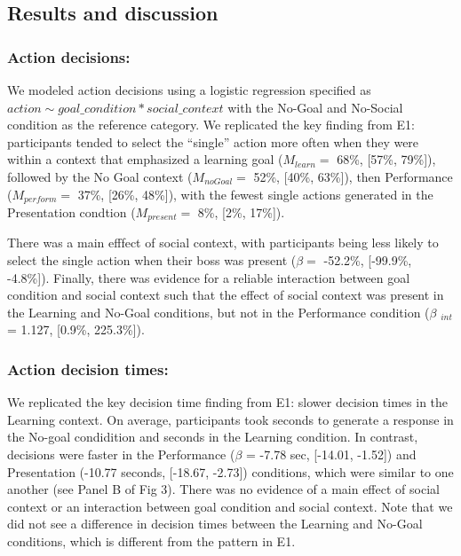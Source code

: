 \documentclass[10pt, letterpaper]{article}
\begin{document}
\subsection{Results and discussion}\label{results-and-discussion-1}

\subsubsection{Action decisions:}\label{action-decisions-1}

We modeled action decisions using a logistic regression specified as
\texttt{$action \sim goal\_condition * social\_context$} with the
No-Goal and No-Social condition as the reference category. We replicated
the key finding from E1: participants tended to select the ``single''
action more often when they were within a context that emphasized a
learning goal (\(M_{learn} =\) 68\%, {[}57\%, 79\%{]}), followed by the
No Goal context (\(M_{noGoal} =\) 52\%, {[}40\%, 63\%{]}), then
Performance (\(M_{perform} =\) 37\%, {[}26\%, 48\%{]}), with the fewest
single actions generated in the Presentation condtion (\(M_{present} =\)
8\%, {[}2\%, 17\%{]}).

There was a main efffect of social context, with participants being less
likely to select the single action when their boss was present
(\(\beta =\) -52.2\%, {[}-99.9\%, -4.8\%{]}). Finally, there was
evidence for a reliable interaction between goal condition and social
context such that the effect of social context was present in the
Learning and No-Goal conditions, but not in the Performance condition
(\(\beta\) \(_{int}\) = 1.127, {[}0.9\%, 225.3\%{]}).

\subsubsection{Action decision times:}\label{action-decision-times-1}

We replicated the key decision time finding from E1: slower decision
times in the Learning context. On average, participants took seconds to
generate a response in the No-goal condidition and seconds in the
Learning condition. In contrast, decisions were faster in the
Performance (\(\beta\) = -7.78 sec, {[}-14.01, -1.52{]}) and
Presentation (-10.77 seconds, {[}-18.67, -2.73{]}) conditions, which
were similar to one another (see Panel B of Fig 3). There was no
evidence of a main effect of social context or an interaction between
goal condition and social context. Note that we did not see a difference
in decision times between the Learning and No-Goal conditions, which is
different from the pattern in E1.
\end{document}
